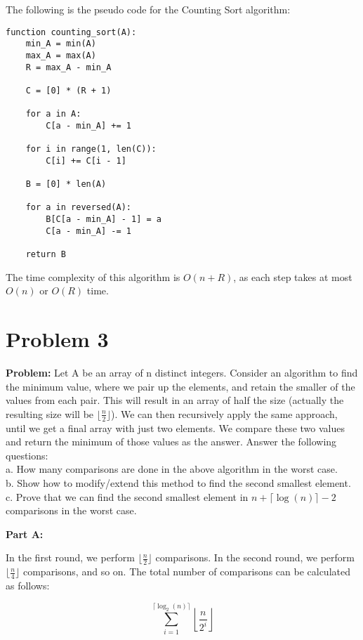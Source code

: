 \documentclass[11pt]{article}
\begin{document}
    The following is the pseudo code for the Counting Sort algorithm:

    \begin{verbatim}
function counting_sort(A):
    min_A = min(A)
    max_A = max(A)
    R = max_A - min_A

    C = [0] * (R + 1)

    for a in A:
        C[a - min_A] += 1

    for i in range(1, len(C)):
        C[i] += C[i - 1]

    B = [0] * len(A)

    for a in reversed(A):
        B[C[a - min_A] - 1] = a
        C[a - min_A] -= 1

    return B
    \end{verbatim}

    The time complexity of this algorithm is $O(n + R)$, as each step takes at most $O(n)$ or $O(R)$ time.


    \section{Problem 3}

    \textbf{Problem:} Let A be an array of n distinct integers. Consider an algorithm to find the minimum value, where we pair up the elements, and retain the smaller of the values from each pair. This will result in an array of half the size (actually the resulting size will be $\lfloor \frac{n}{2} \rfloor$). We can then recursively apply the same approach, until we get a final array with just two elements. We compare these two values and return the minimum of those values as the answer. Answer the following questions: \\
    a. How many comparisons are done in the above algorithm in the worst case. \\
    b. Show how to modify/extend this method to find the second smallest element. \\
    c. Prove that we can find the second smallest element in $n + \lceil\log(n)\rceil - 2$ comparisons in the worst case.


    \textbf{Part A:}

    In the first round, we perform $\lfloor \frac{n}{2} \rfloor$ comparisons. In the second round, we perform $\lfloor \frac{n}{4} \rfloor$ comparisons, and so on. The total number of comparisons can be calculated as follows:

    $$
    \sum_{i=1}^{\lceil\log_2(n)\rceil} \left\lfloor \frac{n}{2^i} \right\rfloor
    $$
\end{document}
